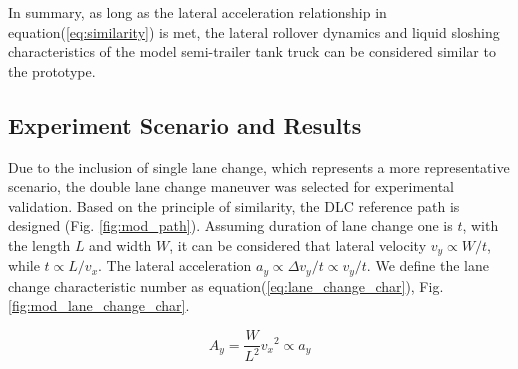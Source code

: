 In summary, as long as the lateral acceleration relationship in equation(\ref{eq:similarity}) is met, the lateral rollover dynamics and liquid sloshing characteristics of the model semi-trailer tank truck can be considered similar to the prototype.


\vspace{-0.5cm}
\subsection{Experiment Scenario and Results}

Due to the inclusion of single lane change, which represents a more representative scenario, the double lane change maneuver was selected for experimental validation. Based on the principle of similarity, the DLC reference path is designed (Fig. \ref{fig:mod_path}). Assuming duration of lane change one is $t$, with the length $L$ and width $W$, it can be considered that lateral velocity $
v_{y} \propto W/t$, while $t\propto L/v_x$. The lateral acceleration $
a_{y} \propto \Delta v_{y}/t \propto v_{y}/t$. We define the lane change characteristic number as equation(\ref{eq:lane_change_char}), Fig. \ref{fig:mod_lane_change_char}. 

\vspace{-0.3cm}
\begin{equation}
A_{y} = \frac{W}{L^{2}}{v_{x}}^{2} \propto a_{y}
\label{eq:lane_change_char}
\end{equation}


